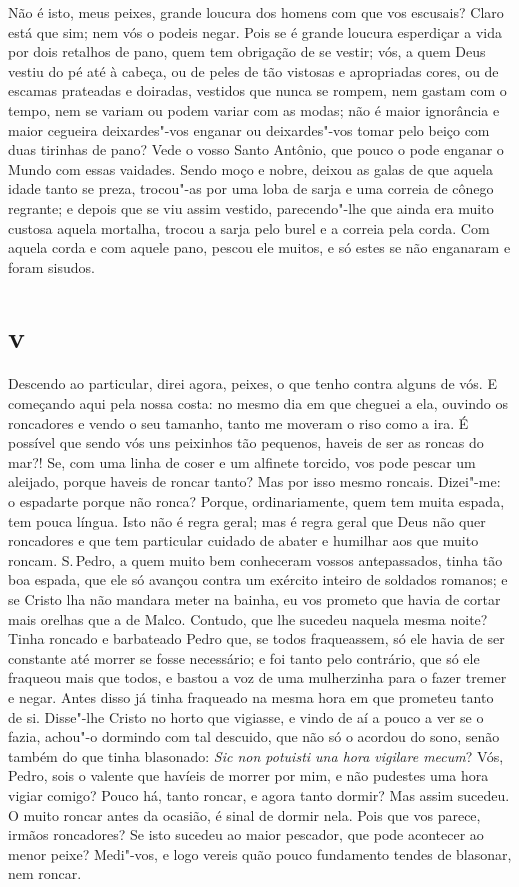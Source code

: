 Não é isto, meus peixes, grande loucura dos homens com que vos escusais?
Claro está que sim; nem vós o podeis negar. Pois se é grande loucura
esperdiçar a vida por dois retalhos de pano, quem tem obrigação de se
vestir; vós, a quem Deus vestiu do pé até à cabeça, ou de peles de tão
vistosas e apropriadas cores, ou de escamas prateadas e doiradas,
vestidos que nunca se rompem, nem gastam com o tempo, nem se variam ou
podem variar com as modas; não é maior ignorância e maior cegueira
deixardes"-vos enganar ou deixardes"-vos tomar pelo beiço com duas
tirinhas de pano? Vede o vosso Santo Antônio, que pouco o pode enganar o
Mundo com essas vaidades. Sendo moço e nobre, deixou as galas de que
aquela idade tanto se preza, trocou"-as por uma loba de sarja e uma
correia de cônego regrante; e depois que se viu assim vestido,
parecendo"-lhe que ainda era muito custosa aquela mortalha, trocou a
sarja pelo burel e a correia pela corda. Com aquela corda e com aquele
pano, pescou ele muitos, e só estes se não enganaram e foram sisudos.

\section*{v}

Descendo ao particular, direi agora, peixes, o que tenho contra alguns
de vós. E começando aqui pela nossa costa: no mesmo dia em que cheguei a
ela, ouvindo os roncadores e vendo o seu tamanho, tanto me moveram o
riso como a ira. É possível que sendo vós uns peixinhos tão pequenos,
haveis de ser as roncas do mar?! Se, com uma linha de coser e um
alfinete torcido, vos pode pescar um aleijado, porque haveis de roncar
tanto? Mas por isso mesmo roncais. Dizei"-me: o espadarte porque não
ronca? Porque, ordinariamente, quem tem muita espada, tem pouca língua.
Isto não é regra geral; mas é regra geral que Deus não quer roncadores e
que tem particular cuidado de abater e humilhar aos que muito roncam.
S.\,Pedro, a quem muito bem conheceram vossos antepassados, tinha tão boa
espada, que ele só avançou contra um exército inteiro de soldados
romanos; e se Cristo lha não mandara meter na bainha, eu vos prometo que
havia de cortar mais orelhas que a de Malco. Contudo, que lhe sucedeu
naquela mesma noite? Tinha roncado e barbateado Pedro que, se todos
fraqueassem, só ele havia de ser constante até morrer se fosse
necessário; e foi tanto pelo contrário, que só ele fraqueou mais que
todos, e bastou a voz de uma mulherzinha para o fazer tremer e negar.
Antes disso já tinha fraqueado na mesma hora em que prometeu tanto de
si. Disse"-lhe Cristo no horto que vigiasse, e vindo de aí a pouco a ver
se o fazia, achou"-o dormindo com tal descuido, que não só o acordou do
sono, senão também do que tinha blasonado: \emph{Sic non potuisti una
hora vigilare mecum}? Vós, Pedro, sois o valente que havíeis de morrer
por mim, e não pudestes uma hora vigiar comigo? Pouco há, tanto
roncar, e agora tanto dormir? Mas assim sucedeu. O muito roncar antes da
ocasião, é sinal de dormir nela. Pois que vos parece, irmãos roncadores?
Se isto sucedeu ao maior pescador, que pode acontecer ao menor peixe?
Medi"-vos, e logo vereis quão pouco fundamento tendes de blasonar, nem
roncar.

